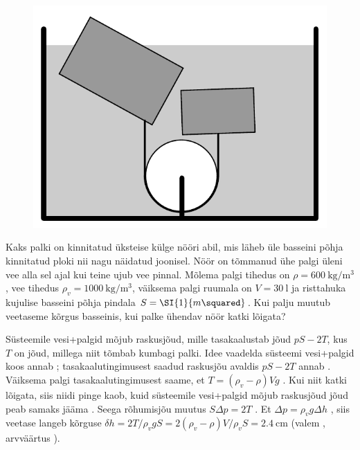 
\begin{figure}
  \vspace{-25pt}
  \begin{center}
  \includegraphics[scale=0.3]{2024-v2g-07-yl.pdf}
  \vspace{-20pt}
  \end{center}
\end{figure}

Kaks palki on kinnitatud üksteise külge nööri abil, mis läheb üle basseini põhja kinnitatud ploki nii nagu näidatud joonisel. Nöör on tõmmanud ühe palgi üleni vee alla sel ajal kui teine ujub vee pinnal. Mõlema palgi tihedus on $\rho=\SI {600}{\kg \per\m\cubed}$, vee tihedus $\rho_v=\SI{1000}{\kg\per\m\cubed}$, väiksema palgi ruumala on $V=\SI{30}\litre$ ja risttahuka kujulise basseini põhja pindala  $S=\SI{1}{m\squared}$. Kui palju muutub veetaseme kõrgus basseinis, kui palke ühendav nöör katki lõigata?


\hint

\solu
Süsteemile vesi+palgid mõjub raskusjõud, mille tasakaalustab jõud $pS-2T$, kus $T$ on jõud, millega niit tõmbab kumbagi palki. Idee vaadelda süsteemi vesi+palgid koos annab ; tasakaalutingimusest saadud raskusjõu avaldis $pS-2T$ annab . Väiksema palgi tasakaalutingimusest saame, et $T=(\rho_v- \rho)Vg$ . Kui niit katki lõigata, siis niidi pinge kaob, kuid süsteemile vesi+palgid mõjub raskusjõud jõud peab samaks jääma . Seega rõhumisjõu muutus $S\Delta p=2T$ . Et $\Delta p=\rho_vg\Delta h$ , siis veetase langeb kõrguse $\delta h=2T/\rho_vgS=2(\rho_v- \rho)V/\rho_vS=\SI{2.4}{\cm}$ (valem , arvväärtus ).

